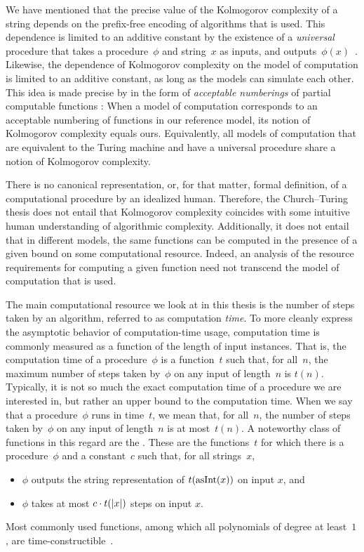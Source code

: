 We have mentioned that the precise value of the Kolmogorov complexity of a string depends on the prefix-free encoding of algorithms that is used.
This dependence is limited to an additive constant by the existence of a \emph{universal} procedure that takes a procedure~$\phi$ and string~$x$ as inputs, and outputs~$\phi(x)$~\parencite{li2008introduction,goldreich2008computational}.
Likewise, the dependence of Kolmogorov complexity on the model of computation is limited to an additive constant, as long as the models can simulate each other.
This idea is made precise by \textcite{rogers1967theory} in the form of \emph{acceptable numberings} of partial computable functions \parencite[see also][]{soare2016turing}:
When a model of computation corresponds to an acceptable numbering of functions in our reference model, its notion of Kolmogorov complexity equals ours.
Equivalently, all models of computation that are equivalent to the Turing machine and have a universal procedure share a notion of Kolmogorov complexity.

There is no canonical representation, or, for that matter, formal definition, of a computational procedure by an idealized human.
Therefore, the Church--Turing thesis does not entail that Kolmogorov complexity coincides with some intuitive human understanding of algorithmic complexity.
Additionally, it does not entail that in different models, the same functions can be computed in the presence of a given bound on some computational resource.
Indeed, an analysis of the resource requirements for computing a given function need not transcend the model of computation that is used.

The main computational resource we look at in this thesis is the number of steps taken by an algorithm, referred to as computation \emph{time}.
To more cleanly express the asymptotic behavior of computation-time usage, computation time is commonly measured as a function of the length of input instances.
That is, the computation time of a procedure~$\phi$ is a function~$t$ such that, for all~$n$, the maximum number of steps taken by~$\phi$ on any input of length~$n$ is $t(n)$.
Typically, it is not so much the exact computation time of a procedure we are interested in, but rather an upper bound to the computation time.
When we say that a procedure~$\phi$ runs in time~$t$, we mean that, for all~$n$, the number of steps taken by~$\phi$ on any input of length~$n$ is at most~$t(n)$.
A noteworthy class of functions in this regard are the .
These are the functions~$t$ for which there is a procedure~$\phi$ and a constant~$c$ such that, for all strings~$x$,
\begin{itemize}
\item $\phi$ outputs the string representation of $t(\operatorname{asInt}(x))$ on input $x$, and
\item $\phi$ takes at most $c \cdot t({\lvert x\rvert})$ steps on input $x$.
\end{itemize}
Most commonly used functions, among which all polynomials of degree at least~$1$, are time-constructible~\parencite{arora2009computational}.

